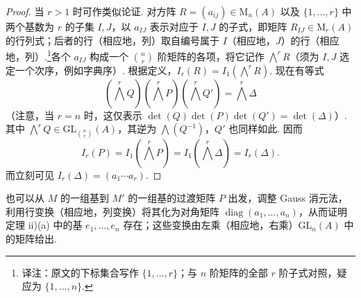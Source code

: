 \begin{proof}
当 $r>1$ 时可作类似论证. 对方阵 $R=(a_{ij})\in\mathrm M_n(A)$ 以及 $\{1,\ldots,r\}$ 中两个基数为 $r$ 的子集 $I,J$，以 $a_{IJ}$ 表示对应于 $I,J$ 的子式，即矩阵 $R_{IJ}\in\mathrm M_r(A)$ 的行列式；后者的行（相应地，列）取自编号属于 $I$（相应地，$J$）的行（相应地，列）.\footnote{译注：原文的下标集合写作 $\{1,\ldots,r\}$；与 $n$ 阶矩阵的全部 $r$ 阶子式对照，疑应为 $\{1,\ldots,n\}$.}各个 $a_{IJ}$ 构成一个 $\binom nr$ 阶矩阵的各项，将它记作 $\bigwedge^r R$（须为 $I,J$ 选定一个次序，例如字典序）. 根据定义，$I_r(R)=I_1(\bigwedge^r R)$. 现在有等式
\[(\bigwedge^r Q)(\bigwedge^r P)(\bigwedge^r Q')=\bigwedge^r\Delta\]
（注意，当 $r=n$ 时，这仅表示 $\det(Q)\det(P)\det(Q')=\det(\Delta)$）. 其中 $\bigwedge^rQ\in\mathrm{GL}_{\binom nr}(A)$，其逆为 $\bigwedge(Q^{-1})$，$Q'$ 也同样如此. 因而
\[I_r(P)=I_1(\bigwedge^rP)=I_1(\bigwedge^r\Delta)=I_r(\Delta).\]
而立刻可见 $I_r(\Delta)=(a_1\cdots a_r)$.
\end{proof}
\begin{remark*}
也可以从 $M$ 的一组基到 $M'$ 的一组基的过渡矩阵 $P$ 出发，调整 Gauss 消元法，利用行变换（相应地，列变换）将其化为对角矩阵 $\operatorname{diag}(a_1,\ldots,a_n)$，从而证明定理 ii)(a) 中的基 $e_1,\ldots,e_n$ 存在；这些变换由左乘（相应地，右乘）$\mathrm{GL}_n(A)$ 中的矩阵给出.
\end{remark*}

